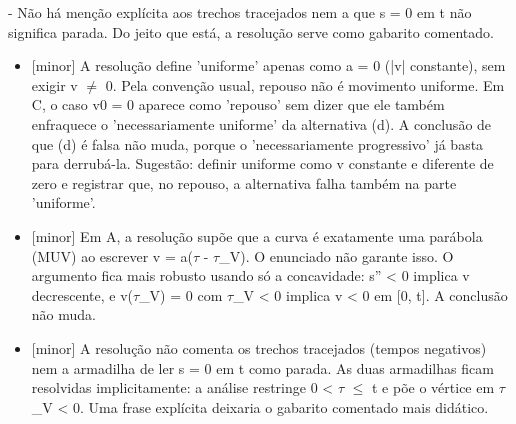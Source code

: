 \documentclass{article}%
\begin{document}
{-} Não há menção explícita aos trechos tracejados nem a que s = 0 em t não significa parada.\newline%
\newline%
Do jeito que está, a resolução serve como gabarito comentado.%
\begin{itemize}%
\item%
{[}minor{]} A resolução define 'uniforme' apenas como a = 0 (|v| constante), sem exigir v $\neq$ 0. Pela convenção usual, repouso não é movimento uniforme. Em C, o caso v0 = 0 aparece como 'repouso' sem dizer que ele também enfraquece o 'necessariamente uniforme' da alternativa (d). A conclusão de que (d) é falsa não muda, porque o 'necessariamente progressivo' já basta para derrubá{-}la. Sugestão: definir uniforme como v constante e diferente de zero e registrar que, no repouso, a alternativa falha também na parte 'uniforme'.%
\item%
{[}minor{]} Em A, a resolução supõe que a curva é exatamente uma parábola (MUV) ao escrever v = a($\tau$ - $\tau$\_V). O enunciado não garante isso. O argumento fica mais robusto usando só a concavidade: s'' < 0 implica v decrescente, e v($\tau$\_V) = 0 com $\tau$\_V < 0 implica v < 0 em {[}0, t{]}. A conclusão não muda.%
\item%
{[}minor{]} A resolução não comenta os trechos tracejados (tempos negativos) nem a armadilha de ler s = 0 em t como parada. As duas armadilhas ficam resolvidas implicitamente: a análise restringe 0 < $\tau$ $\leq$ t e põe o vértice em $\tau$\_V < 0. Uma frase explícita deixaria o gabarito comentado mais didático.%
\end{itemize}%
\end{document}

